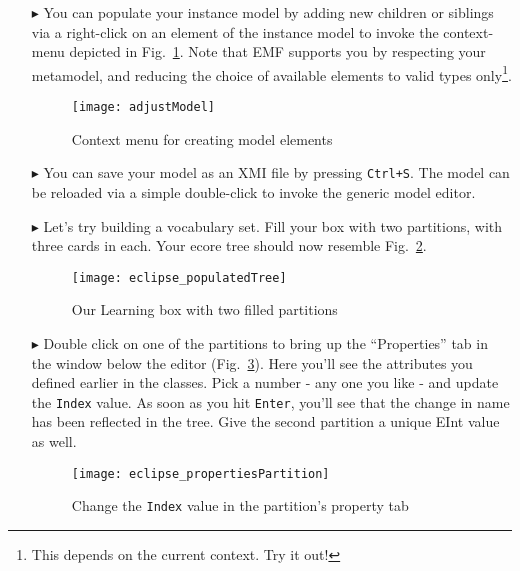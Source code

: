 \begin{itemize}
\item[$\blacktriangleright$] You can populate your instance model by adding new children or siblings via a right-click on an element of the instance model to
invoke the context-menu depicted in Fig.~\ref{fig:create_instance}. Note that EMF supports you by respecting your metamodel, and reducing the choice of
available elements to valid types only\footnote{This depends on the current context. Try it out!}.

\begin{figure}[htbp]
	\centering
  \texttt{[image: adjustModel]}
	\caption{Context menu for creating model elements}
	\label{fig:create_instance}
\end{figure}

\item[$\blacktriangleright$] You can save your model as an XMI file by pressing \texttt{Ctrl+S}. The model can be reloaded via a simple double-click to invoke
the generic model editor.

\item[$\blacktriangleright$] Let's try building a vocabulary set. Fill your box with two partitions, with three cards in each. Your ecore tree should now
resemble Fig.~\ref{fig:eclipse_populatedTree}.

\begin{figure}[htbp]
	\centering
  \texttt{[image: eclipse\_populatedTree]}
	\caption{Our Learning box with two filled partitions}
	\label{fig:eclipse_populatedTree}
\end{figure}

\vfill
\pagebreak

\item[$\blacktriangleright$] Double click on one of the partitions to bring up the ``Properties'' tab in the window below the editor
(Fig.~\ref{fig:properties_partition}). Here you'll see the attributes you defined earlier in the classes. Pick a number - any one you like - and update the
\texttt{Index} value. As soon as you hit \texttt{Enter}, you'll see that the change in name has been reflected in the tree. Give the second partition a unique
EInt value as well.

\vspace{0.5cm}

\begin{figure}[htbp]
	\centering
  \texttt{[image: eclipse\_propertiesPartition]}
	\caption{Change the \texttt{Index} value in the partition's property tab}
	\label{fig:properties_partition}
\end{figure}


\end{itemize}
